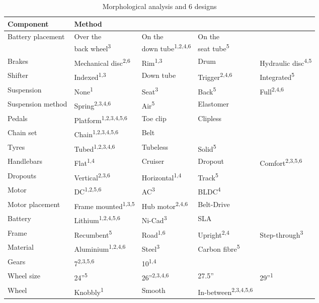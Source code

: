 \documentclass[a4paper,11pt]{article}
\begin{document}
\begin{table}[!ht]
	\centering
	\caption{Morphological analysis and 6 designs}
	\begin{tabular}{l l l l l}
		\hline
		Component&Method&&&\\\hline
		Battery placement&\makecell[l]{Over the\\back wheel\textsuperscript{3}}&\makecell[l]{On the \\down tube\textsuperscript{1,2,4,6}}&\makecell[l]{On the \\seat tube\textsuperscript{5}}&\\\hline
		Brakes&Mechanical disc\textsuperscript{2,6}&Rim\textsuperscript{1,3}&Drum&Hydraulic disc\textsuperscript{4,5}\\\hline
		Shifter&Indexed\textsuperscript{1,3}&Down tube&Trigger\textsuperscript{2,4,6}&Integrated\textsuperscript{5}\\\hline
		Suspension&None\textsuperscript{1}&Seat\textsuperscript{3}&Back\textsuperscript{5}&Full\textsuperscript{2,4,6}\\\hline
		Suspension method&Spring\textsuperscript{2,3,4,6}&Air\textsuperscript{5}&Elastomer\\\hline
		Pedals&Platform\textsuperscript{1,2,3,4,5,6}&Toe clip&Clipless\\\hline
		Chain set&Chain\textsuperscript{1,2,3,4,5,6}&Belt&&\\\hline
		Tyres&Tubed\textsuperscript{1,2,3,4,6}&Tubeless&Solid\textsuperscript{5}&\\\hline
		Handlebars&Flat\textsuperscript{1,4}&Cruiser&Dropout&Comfort\textsuperscript{2,3,5,6}\\\hline
		Dropouts&Vertical\textsuperscript{2,3,6}&Horizontal\textsuperscript{1,4}&Track\textsuperscript{5}&\\\hline
		Motor&DC\textsuperscript{1,2,5,6}&AC\textsuperscript{3}&BLDC\textsuperscript{4}&\\\hline
		Motor placement&Frame mounted\textsuperscript{1,3,5}&Hub motor\textsuperscript{2,4,6}&Belt-Drive&\\\hline
		Battery&Lithium\textsuperscript{1,2,4,5,6}&Ni-Cad\textsuperscript{3}&SLA&\\\hline
		Frame&Recumbent\textsuperscript{5}&Road\textsuperscript{1,6}&Upright\textsuperscript{2,4}&Step-through\textsuperscript{3}\\\hline
		Material&Aluminium\textsuperscript{1,2,4,6}&Steel\textsuperscript{3}&Carbon fibre\textsuperscript{5}&\\\hline
		Gears&7\textsuperscript{2,3,5,6}&10\textsuperscript{1,4}&&\\\hline
		Wheel size&24''\textsuperscript{5}&26''\textsuperscript{2,3,4,6}&27.5''&29''\textsuperscript{1}\\\hline
		Wheel&Knobbly\textsuperscript{1}&Smooth&In-between\textsuperscript{2,3,4,5,6}&\\
	\end{tabular}
\end{table}
\end{document}

